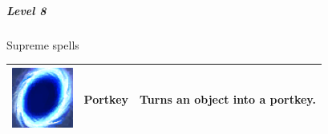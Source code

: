 \subparagraph{Level 8} 
Supreme spells \\
\begin{tabular}{ m{2cm}m{3cm}m{8cm} } \hline
  	\includegraphics[width=2cm]{../Pictures/Gameplay/Spells/Icon/Portkey_spell_icon.png} & \textbf{Portkey} & Turns an object into a portkey.\\ \hline
\end{tabular}


\pagebreak









